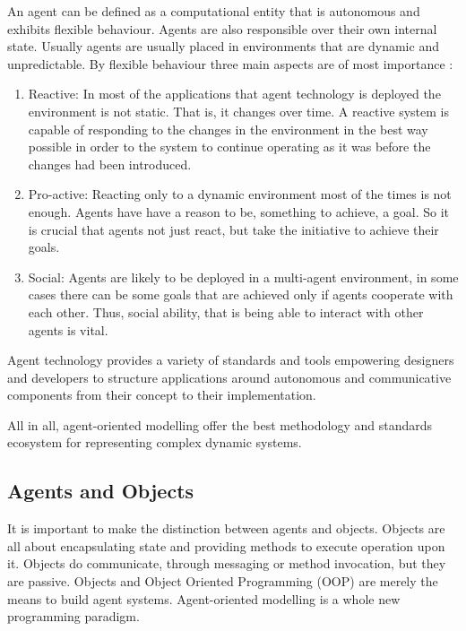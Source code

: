 An agent can be defined as a computational entity that is autonomous and exhibits flexible behaviour. Agents are also responsible over their own internal state. Usually agents are usually placed in environments that are dynamic and unpredictable. By flexible behaviour three main aspects are of most importance\cite{wooldridge2009introduction} :

\begin{enumerate}
\item Reactive: In most of the applications that agent technology is deployed the environment is not static. That is, it changes over time. A reactive system is capable of responding to the changes in the environment in the best way possible in order to the system to continue operating as it was before the changes had been introduced. 

\item Pro-active: Reacting only to a dynamic environment most of the times is not enough. Agents have have a reason to be, something to achieve, a goal. So it is crucial that agents not just react, but take the initiative to achieve their goals.

\item Social: Agents are likely to be deployed in a multi-agent environment, in some cases there can be some goals that are achieved only if agents cooperate with each other. Thus, social ability, that is being able to interact with other agents is vital.
\end{enumerate}

Agent technology provides a variety of standards and tools empowering designers and developers to structure applications around autonomous and communicative components from their concept to their implementation.\cite{al3roadmap}

All in all, agent-oriented modelling offer the best methodology and standards ecosystem for representing complex dynamic systems.

\subsection{Agents and Objects}

It is important to make the distinction between agents and objects. Objects are all about encapsulating state and providing methods to execute operation upon it. Objects do communicate, through messaging or method invocation, but they are passive. Objects and Object Oriented Programming (OOP) are merely the means to build agent systems. Agent-oriented modelling is a whole new programming paradigm. 


